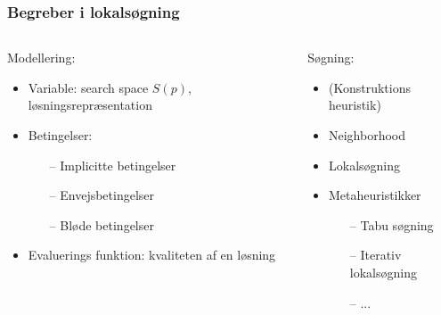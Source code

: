 \documentclass[smaller,handouts]{beamer}
\begin{document}
\begin{frame}
 \frametitle{Begreber i lokalsøgning}
  \begin{columns}[T]
   \begin{column}[T]{.5\textwidth}
   Modellering: 
   \pause
 \begin{itemize}[<+->]
 \item Variable:  search space $S(p)$, løsningsrepræsentation
 \item Betingelser: 
 \begin{itemize}[<+->]
  \item[--] Implicitte betingelser
  \item[--] Envejsbetingelser
  \item[--] Bløde betingelser
  
 \end{itemize}
\item Evaluerings funktion: kvaliteten af en løsning
 \end{itemize}
  \end{column}
   \begin{column}[T]{.5\textwidth}
   Søgning:
    \begin{itemize}[<+->]
     \item (Konstruktions heuristik)
     \item Neighborhood \pause
     \item Lokalsøgning
     \item Metaheuristikker
      \begin{itemize}[<+->]
  \item[--] Tabu søgning
  \item[--] Iterativ lokalsøgning
  \item[--] ...
 \end{itemize}
    \end{itemize}
   \end{column}
  \end{columns}
  \begin{center}

\end{center}
\end{frame}
\end{document}
